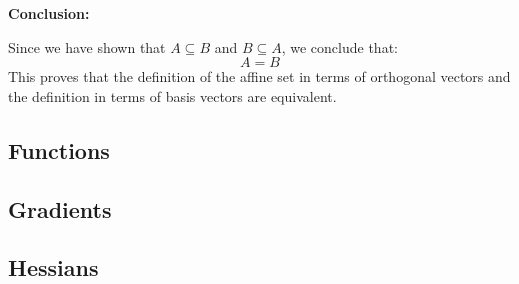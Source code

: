 \begin{derivation}
            \textbf{Conclusion:}

            Since we have shown that \( A \subseteq B \) and \( B \subseteq A \), we conclude that:
            \[
            A = B
            \]
            This proves that the definition of the affine set in terms of orthogonal vectors and the definition in terms of basis vectors are equivalent.
        \end{derivation}
        
\subsection{Functions}
\subsection{Gradients}
\subsection{Hessians}
